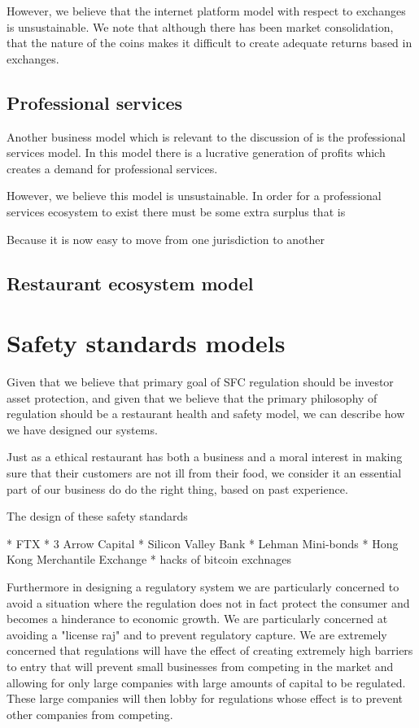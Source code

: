 However, we believe that the internet platform model with respect to
exchanges is unsustainable.  We note that although there has been
market consolidation, that the nature of the coins makes it difficult
to create adequate returns based in exchanges.

\subsection{Professional services}

Another business model which is relevant to the discussion of is the
professional services model.  In this model there is a lucrative
generation of profits which creates a demand for professional
services.

However, we believe this model is unsustainable.  In order for a
professional services ecosystem to exist there must be some extra
surplus that is

Because it is now easy to move from one jurisdiction to another

\subsection{Restaurant ecosystem model}

\section{Safety standards models}

Given that we believe that primary goal of SFC regulation should be
investor asset protection, and given that we believe that the primary
philosophy of regulation should be a restaurant health and safety
model, we can describe how we have designed our systems.

Just as a ethical restaurant has both a business and a moral interest
in making sure that their customers are not ill from their food, we
consider it an essential part of our business do do the right thing,
based on past experience.

The design of these safety standards

* FTX
* 3 Arrow Capital
* Silicon Valley Bank
* Lehman Mini-bonds
* Hong Kong Merchantile Exchange
* hacks of bitcoin exchnages

Furthermore in designing a regulatory system we are particularly
concerned to avoid a situation where the regulation does not in fact
protect the consumer and becomes a hinderance to economic growth.  We
are particularly concerned at avoiding a "license raj" and to prevent
regulatory capture.  We are extremely concerned that regulations will
have the effect of creating extremely high barriers to entry that will
prevent small businesses from competing in the market and allowing for
only large companies with large amounts of capital to be regulated.
These large companies will then lobby for regulations whose effect is
to prevent other companies from competing.

